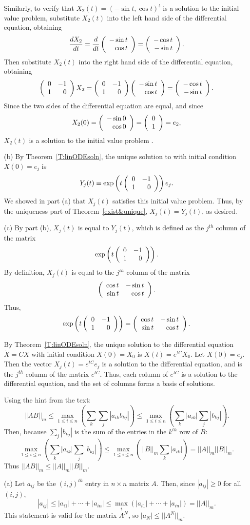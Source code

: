 \para Similarly, to verify that $X_2(t) = (-\sin t,\cos t)^t$ is a
solution to the initial value problem, substitute $X_2(t)$ into the
left hand side of the differential equation, obtaining
\[
\frac{dX_2}{dt} = \frac{d}{dt}\left(\begin{array}{r} -\sin t \\ \cos t\end{array}\right) =
\left(\begin{array}{r} -\cos t \\ -\sin t\end{array}\right).
\]
Then substitute $X_2(t)$ into the right hand side of the differential
equation, obtaining
\[
\left(\begin{array}{rr} 0 & -1\\ 1 &0\end{array}\right)X_2 = \left(\begin{array}{rr} 0 & -1\\ 1 &0\end{array}\right)\left(\begin{array}{r} -\sin t \\ \cos t\end{array}\right)
= \left(\begin{array}{r} -\cos t \\ -\sin t\end{array}\right).
\]
Since the two sides of the differential equation are equal, and since
\[
X_2(0) = \left(\begin{array}{r} -\sin 0 \\ \cos 0\end{array}\right) = \left(\begin{array}{r} 0 \\ 1\end{array}\right) = e_2,
\]
$X_2(t)$ is a solution to the initial value problem .

(b) By Theorem~\ref{T:linODEsoln}, the unique
solution to  with initial condition $X(0) = e_j$ is
\[
Y_j(t) \equiv \exp\left(t\left(\begin{array}{rr} 0 & -1\\ 1 &0\end{array}\right)\right)e_j.
\]
We showed in part (a) that $X_j(t)$ satisfies this initial value
problem.  Thus, by the uniqueness part of Theorem~\ref{exist&unique},
$X_j(t) = Y_j(t)$, as desired.

(c) By part (b), $X_j(t)$ is equal to $Y_j(t)$, which is defined as
the $j^{th}$ column of the matrix
\[
\exp\left(t\left(\begin{array}{rr} 0 & -1\\ 1 &0\end{array}\right)\right).
\]
By definition, $X_j(t)$ is equal to the $j^{th}$ column of the matrix
\[
\left(\begin{array}{rr} \cos t & -\sin t\\ \sin t &\cos t\end{array}\right).
\]
Thus,
\[
\exp\left(t\left(\begin{array}{rr} 0 & -1\\ 1 &0\end{array}\right)\right) =
\left(\begin{array}{rr} \cos t & -\sin t\\ \sin t &\cos t\end{array}\right).
\]

 By Theorem~\ref{T:linODEsoln},
the unique solution to the differential equation $\dot{X} = CX$ with
initial condition $X(0) = X_0$ is $X(t) = e^{tC}X_0$.  Let $X(0) =
e_j$.  Then the vector $X_j(t) = e^{tC}e_j$ is a solution to the
differential equation, and is the $j^{th}$ column of the matrix
$e^{tC}$.  Thus, each column of $e^{tC}$ is a solution to the
differential equation, and the set of columns forms a basis of
solutions.


 Using the hint from the text:
\[
||AB||_m \leq \max_{1\leq i\leq n}
\left(\sum_k\sum_j\left|a_{ik}b_{kj}\right|\right) \leq
\max_{1\leq i\leq n} \left(\sum_k|a_{ik}|\sum_j|b_{kj}|\right).
\]
Then, because $\sum_j|b_{kj}|$ is the sum of the entries in the $k^{th}$
row of $B$:
\[
\max_{1\leq i\leq n}
\left(\sum_k|a_{ik}|\sum_j|b_{kj}|\right) \leq
\max_{1 \leq i \leq n}
\left(||B||_m \sum_k|a_{ik}|\right) =
||A||_m ||B||_m.
\]
Thus $||AB||_m \leq ||A||_m ||B||_m$.

(a) Let $a_{ij}$ be the $(i,j)^{th}$ entry in $n \times n$ matrix $A$. 
Then, since $|a_{ij}| \geq 0$ for all $(i,j)$,
\[ |a_{ij}| \leq |a_{i1}| + \cdots + |a_{in}| \leq
\max_i(|a_{i1}| + \cdots + |a_{in}|) = ||A||_m. \]
This statement is valid for the matrix $A^N$, so $|a_N| \leq ||A^N||_m$.

